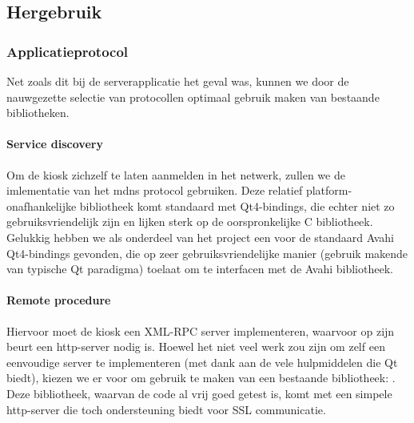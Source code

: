 \subsection{Hergebruik}

\subsubsection{Applicatieprotocol}

Net zoals dit bij de serverapplicatie het geval was, kunnen we door de nauwgezette selectie van protocollen optimaal gebruik maken van bestaande bibliotheken.

\paragraph{Service discovery} Om de kiosk zichzelf te laten aanmelden in het netwerk, zullen we de  imlementatie van het \ac{mdns} protocol gebruiken. Deze relatief platform-onafhankelijke bibliotheek komt standaard met Qt4-bindings, die echter niet zo gebruiksvriendelijk zijn en lijken sterk op de oorspronkelijke C bibliotheek. Gelukkig hebben we als onderdeel van het  project een  voor de standaard Avahi Qt4-bindings gevonden, die op zeer gebruiksvriendelijke manier (gebruik makende van typische Qt paradigma) toelaat om te interfacen met de Avahi bibliotheek.

\paragraph{Remote procedure} Hiervoor moet de kiosk een XML-RPC server implementeren, waarvoor op zijn beurt een \ac{http}-server nodig is. Hoewel het niet veel werk zou zijn om zelf een eenvoudige server te implementeren (met dank aan de vele hulpmiddelen die Qt biedt), kiezen we er voor om gebruik te maken van een bestaande bibliotheek: . Deze bibliotheek, waarvan de code al vrij goed getest is, komt met een simpele \ac{http}-server die toch ondersteuning biedt voor SSL communicatie.

